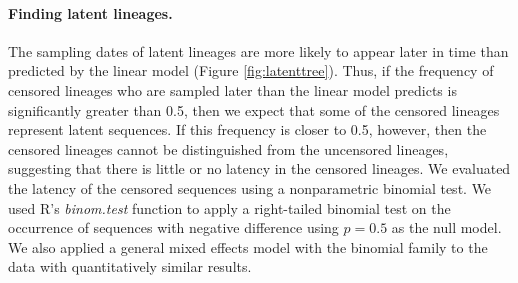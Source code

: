 \documentclass{bmcart}
\begin{document}
\paragraph {Finding latent lineages.} \label{subsec:experiments}

%
%
%


The sampling dates of latent lineages are more likely to appear later in time than predicted by the linear model (Figure \ref{fig:latenttree}).
Thus, if the frequency of censored lineages who are sampled later than the linear model predicts is significantly greater than 0.5, then we expect that some of the censored lineages represent latent sequences.
If this frequency is closer to 0.5, however, then the censored lineages cannot be distinguished from the uncensored lineages, suggesting that there is little or no latency in the censored lineages.
We evaluated the latency of the censored sequences using a nonparametric binomial test.
We used R's {\it binom.test} function to apply a right-tailed binomial test on the occurrence of sequences with negative difference using $p=0.5$ as the null model.
We also applied a general mixed effects model with the binomial family to the data with quantitatively similar results.
\end{document}
